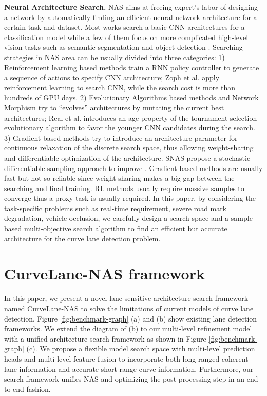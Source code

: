 \documentclass[runningheads]{llncs}
\begin{document}
\textbf{Neural Architecture Search. }NAS aims at freeing expert's
labor of designing a network by automatically finding an efficient
neural network architecture for a certain task and dataset. Most works
search a basic CNN architectures for a classification model \cite{liu2018darts,cai2018proxylessnas,liu2018progressive,tan2018mnasnet,xie2018snas}
while a few of them focus on more complicated high-level vision tasks
such as semantic segmentation and object detection \cite{chen2018searching,chen2019detnas,xu2019auto,yao2020sm}.
Searching strategies in NAS area can be usually divided into three
categories: 1) Reinforcement learning based methods \cite{baker2016designing,zoph2018learning,cai2018efficient,zhong2018practical}
train a RNN policy controller to generate a sequence of actions to
specify CNN architecture; Zoph et al. \cite{zoph2016neural,zoph2018learning}
apply reinforcement learning to search CNN, while the search cost
is more than hundreds of GPU days. 2) Evolutionary Algorithms based
methods and Network Morphism \cite{real2017large,liu2017hierarchical,jiang2020sp}
try to \textquotedblleft evolves\textquotedblright{} architectures
by mutating the current best architectures; Real et al. \cite{real2019regularized}
introduces an age property of the tournament selection evolutionary
algorithm to favor the younger CNN candidates during the search. 3)
Gradient-based methods \cite{liu2018darts,xie2018snas,cai2018proxylessnas}
try to introduce an architecture parameter for continuous relaxation
of the discrete search space, thus allowing weight-sharing and differentiable
optimization of the architecture. SNAS \cite{xie2018snas} propose
a stochastic differentiable sampling approach to improve \cite{liu2018darts}.
Gradient-based methods are usually fast but not so reliable since
weight-sharing makes a big gap between the searching and final training.
RL methods usually require massive samples to converge thus a proxy
task is usually required. In this paper, by considering the task-specific
problems such as real-time requirement, severe road mark degradation,
vehicle occlusion, we carefully design a search space and a sample-based
multi-objective search algorithm to find an efficient but accurate
architecture for the curve lane detection problem.

\section{CurveLane-NAS framework}

In this paper, we present a novel lane-sensitive architecture search
framework named CurveLane-NAS to solve the limitations of current
models of curve lane detection. Figure \ref{fig:benchmark-graph}
(a) and (b) show existing lane detection frameworks. We extend the
diagram of (b) to our multi-level refinement model with a unified
architecture search framework as shown in Figure \ref{fig:benchmark-graph}
(c). We propose a flexible model search space with multi-level prediction
heads and multi-level feature fusion to incorporate both long-ranged
coherent lane information and accurate short-range curve information.
Furthermore, our search framework unifies NAS and optimizing the post-processing
step in an end-to-end fashion. 
\end{document}
